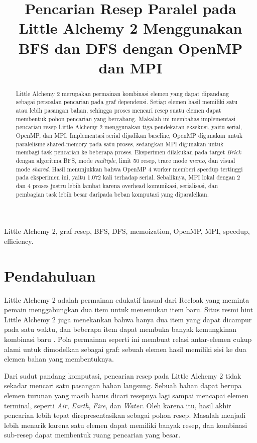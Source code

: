 \documentclass[conference]{IEEEtran}
\title{Pencarian Resep Paralel pada Little Alchemy 2 Menggunakan BFS dan DFS dengan OpenMP dan MPI}
\author{
\makebox[0.96\textwidth][c]{%
\begin{minipage}[t]{0.30\textwidth}
\centering
{\large Muhammad Yusuf Al Azmi\par}
\vspace{0.35em}
{\itshape School of Electrical Engineering and Informatics\par}
{\itshape Bandung Institute of Technology\par}
Bandung, Indonesia\par
13222062@mahasiswa.itb.ac.id
\end{minipage}\hfill
\begin{minipage}[t]{0.30\textwidth}
\centering
{\large Syaugi Adhia Feriyaldi\par}
\vspace{0.35em}
{\itshape School of Electrical Engineering and Informatics\par}
{\itshape Bandung Institute of Technology\par}
Bandung, Indonesia\par
13222068@mahasiswa.itb.ac.id
\end{minipage}\hfill
\begin{minipage}[t]{0.30\textwidth}
\centering
{\large William Gerald Briandelo\par}
\vspace{0.35em}
{\itshape School of Electrical Engineering and Informatics\par}
{\itshape Bandung Institute of Technology\par}
Bandung, Indonesia\par
13222061@mahasiswa.itb.ac.id
\end{minipage}%
}
}
\begin{document}
\maketitle

\begin{abstract}
Little Alchemy 2 merupakan permainan kombinasi elemen yang dapat dipandang sebagai persoalan pencarian pada graf dependensi. Setiap elemen hasil memiliki satu atau lebih pasangan bahan, sehingga proses mencari resep suatu elemen dapat membentuk pohon pencarian yang bercabang. Makalah ini membahas implementasi pencarian resep Little Alchemy 2 menggunakan tiga pendekatan eksekusi, yaitu serial, OpenMP, dan MPI. Implementasi serial dijadikan baseline, OpenMP digunakan untuk paralelisme shared-memory pada satu proses, sedangkan MPI digunakan untuk membagi task pencarian ke beberapa proses. Eksperimen dilakukan pada target \textit{Brick} dengan algoritma BFS, mode \textit{multiple}, limit 50 resep, trace mode \textit{memo}, dan visual mode \textit{shared}. Hasil menunjukkan bahwa OpenMP 4 worker memberi speedup tertinggi pada eksperimen ini, yaitu 1.072 kali terhadap serial. Sebaliknya, MPI lokal dengan 2 dan 4 proses justru lebih lambat karena overhead komunikasi, serialisasi, dan pembagian task lebih besar daripada beban komputasi yang diparalelkan.
\end{abstract}

\begin{IEEEkeywords}
Little Alchemy 2, graf resep, BFS, DFS, memoization, OpenMP, MPI, speedup, efficiency.
\end{IEEEkeywords}

\section{Pendahuluan}

Little Alchemy 2 adalah permainan edukatif-kasual dari Recloak yang meminta pemain menggabungkan dua item untuk menemukan item baru. Situs resmi hint Little Alchemy 2 juga menekankan bahwa hanya dua item yang dapat dicampur pada satu waktu, dan beberapa item dapat membuka banyak kemungkinan kombinasi baru \cite{littlealchemyhints}. Pola permainan seperti ini membuat relasi antar-elemen cukup alami untuk dimodelkan sebagai graf: sebuah elemen hasil memiliki sisi ke dua elemen bahan yang membentuknya.

Dari sudut pandang komputasi, pencarian resep pada Little Alchemy 2 tidak sekadar mencari satu pasangan bahan langsung. Sebuah bahan dapat berupa elemen turunan yang masih harus dicari resepnya lagi sampai mencapai elemen terminal, seperti \textit{Air}, \textit{Earth}, \textit{Fire}, dan \textit{Water}. Oleh karena itu, hasil akhir pencarian lebih tepat direpresentasikan sebagai pohon resep. Masalah menjadi lebih menarik karena satu elemen dapat memiliki banyak resep, dan kombinasi sub-resep dapat membentuk ruang pencarian yang besar.
\end{document}
